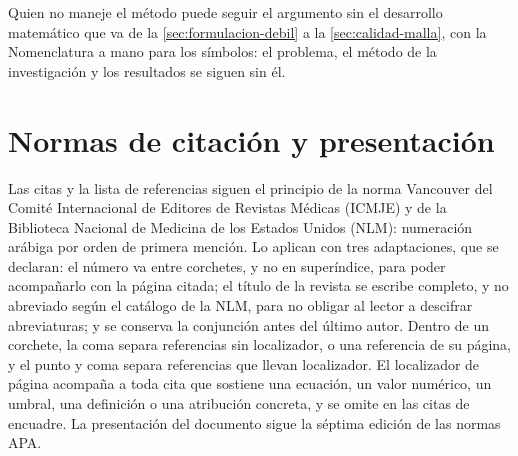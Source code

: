 Quien no maneje el método puede seguir el argumento sin el desarrollo matemático que va de la \autoref{sec:formulacion-debil} a la \autoref{sec:calidad-malla}, con la Nomenclatura a mano para los símbolos: el problema, el método de la investigación y los resultados se siguen sin él.

\section*{Normas de citación y presentación}

Las citas y la lista de referencias siguen el principio de la norma Vancouver del Comité Internacional de Editores de Revistas Médicas (ICMJE) y de la Biblioteca Nacional de Medicina de los Estados Unidos (NLM): numeración arábiga por orden de primera mención. Lo aplican con tres adaptaciones, que se declaran: el número va entre corchetes, y no en superíndice, para poder acompañarlo con la página citada; el título de la revista se escribe completo, y no abreviado según el catálogo de la NLM, para no obligar al lector a descifrar abreviaturas; y se conserva la conjunción antes del último autor. Dentro de un corchete, la coma separa referencias sin localizador, o una referencia de su página, y el punto y coma separa referencias que llevan localizador. El localizador de página acompaña a toda cita que sostiene una ecuación, un valor numérico, un umbral, una definición o una atribución concreta, y se omite en las citas de encuadre. La presentación del documento sigue la séptima edición de las normas APA.
